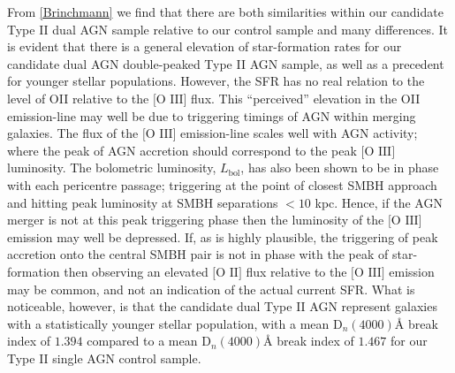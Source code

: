 From \ref{Brinchmann} we find that there are both similarities within our candidate Type II dual AGN sample relative to our control sample and many differences. It is evident that there is a general elevation of star-formation rates for our candidate dual AGN double-peaked Type II AGN sample, as well as a precedent for younger stellar populations. However, the SFR has no real relation to the level of OII relative to the $\text{[O III]}$ flux. This “perceived” elevation in the OII emission-line may well be due to triggering timings of AGN within merging galaxies. The flux of the $\text{[O III]}$ emission-line scales well with AGN activity; where the peak of AGN accretion should correspond to the peak $\text{[O III]}$ luminosity. The bolometric luminosity, $L_{\text{bol}}$, has also been shown to be in phase with each pericentre passage; triggering at the point of closest SMBH approach and hitting peak luminosity at SMBH separations $<{10}$ kpc. Hence, if the AGN merger is not at this peak triggering phase then the luminosity of the $\text{[O III]}$ emission may well be depressed. If, as is highly plausible, the triggering of peak accretion onto the central SMBH pair is not in phase with the peak of star-formation then observing an elevated $\text{[O II]}$ flux relative to the $\text{[O III]}$ emission may be common, and not an indication of the actual current SFR. What is noticeable, however, is that the candidate dual Type II AGN represent galaxies with a statistically younger stellar population, with a mean $\text{D}_{n}(4000)Å$ break index of $1.394$ compared to a mean $\text{D}_{n}(4000)Å$ break index of $1.467$ for our Type II single AGN control sample.     

